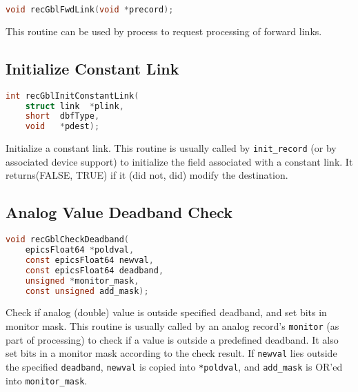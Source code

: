 \begin{lstlisting}[language=C]
void recGblFwdLink(void *precord);
\end{lstlisting}

This routine can be used by process to request processing of forward links.

\subsection{Initialize Constant Link}

\begin{lstlisting}[language=C]
int recGblInitConstantLink(
    struct link  *plink,
    short  dbfType,
    void   *pdest);
\end{lstlisting}

Initialize a constant link.
This routine is usually called by \verb|init_record| (or by associated device support) to initialize the field associated with a constant link.
It returns(FALSE, TRUE) if it (did not, did) modify the destination.

\subsection{Analog Value Deadband Check}

\begin{lstlisting}[language=C]
void recGblCheckDeadband(
    epicsFloat64 *poldval,
    const epicsFloat64 newval,
    const epicsFloat64 deadband,
    unsigned *monitor_mask,
    const unsigned add_mask);
\end{lstlisting}

Check if analog (double) value is outside specified deadband, and set bits in monitor mask.
This routine is usually called by an analog record's \verb|monitor| (as part of processing) to check if a value is outside a predefined deadband.
It also set bits in a monitor mask according to the check result.
If \verb|newval| lies outside the specified \verb|deadband|, \verb|newval| is copied into \verb|*poldval|, and \verb|add_mask| is OR'ed into \verb|monitor_mask|.
